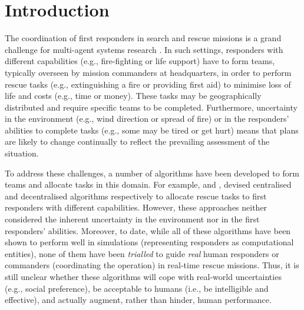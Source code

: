 \section{Introduction}
\noindent The coordination of first responders in search and rescue missions is a grand challenge for multi-agent systems research \cite{kitano:2001}. In such settings, responders with different capabilities (e.g., fire-fighting or life support) have to form teams, typically overseen by mission commanders at headquarters, in order to perform rescue tasks  (e.g., extinguishing a fire or providing first aid) to minimise  loss of life and costs (e.g., time or money). These tasks may be geographically distributed  and require specific teams  to be completed. Furthermore, uncertainty in the environment (e.g., wind direction or spread of fire) or in the responders' abilities to complete tasks (e.g., some may be tired or get hurt) means that plans are likely to change continually to reflect the prevailing assessment of the situation. 

To address these challenges, a number of algorithms  have been developed to form teams and allocate tasks in this domain. For example, \cite{ramchurn:etal:2010,Scerri2005} and \cite{Chapman2009}, devised centralised and decentralised algorithms respectively to allocate rescue tasks to first responders with different capabilities. However, these approaches neither considered the inherent uncertainty in the environment nor in the first responders' abilities. Moreover, to date, while all of these algorithms have been shown to perform well in simulations (representing responders as computational entities), none of them have been \emph{trialled} to guide \emph{real} human responders or commanders (coordinating the operation) in real-time rescue missions. Thus, it is still unclear whether these algorithms will cope with real-world uncertainties (e.g., social preference), be acceptable to humans (i.e., be intelligible and effective), and actually augment, rather than hinder,  human performance.

